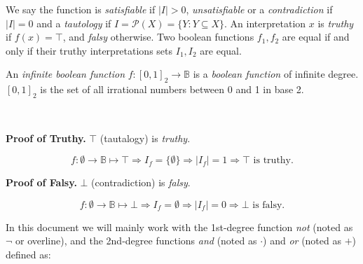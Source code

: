 \documentclass[12pt, letterpaper]{article}
\begin{document}
    We say the function is \emph{satisfiable} if $|I| > 0$, 
    \emph{unsatisfiable} or a \emph{contradiction} if $|I| = 0$
    and a \emph{tautology} if $I=\mathcal{P}(X) = \{Y:Y\subseteq X\}$.
    An interpretation $x$ is \emph{truthy} if $f(x) = \top$, and
    \emph{falsy} otherwise. Two boolean functions $f_1, f_2$ are equal
    if and only if their truthy interpretations sets $I_1, I_2$ are equal.

    An \emph{infinite boolean function} $f:{[0,1]}_2\rightarrow\mathbb{B}$
    is a \emph{boolean function} of infinite degree. ${[0,1]}_2$ is the 
    set of all irrational numbers between 0 and 1 in base 2. 

    {\ } %

    \textbf{Proof of Truthy.} $\top$ (tautalogy) is \emph{truthy}.
    
    \[f:\emptyset\rightarrow\mathbb{B}\mapsto\top \Rightarrow
    I_f = \{\emptyset\} \Rightarrow |I_f| = 1 \Rightarrow \top\text{ is truthy.}\]

    \textbf{Proof of Falsy.} $\bot$ (contradiction) is \emph{falsy}.

    \[f:\emptyset\rightarrow\mathbb{B}\mapsto\bot \Rightarrow
    I_f = \emptyset \Rightarrow |I_f| = 0 \Rightarrow \bot\text{ is falsy.}\]

    In this document we will mainly work with the 1st-degree function
    \emph{not} (noted as $\lnot$ or overline), and the 2nd-degree functions
    \emph{and} (noted as $\cdot$) and \emph{or} (noted as $+$) defined as:
\end{document}
